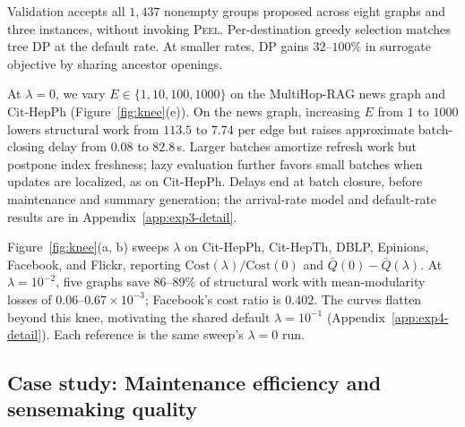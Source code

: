 



 Validation accepts all $1{,}437$ nonempty groups
proposed across eight graphs and three instances, without invoking
\textsc{Peel}. Per-destination greedy selection matches tree DP at the
default rate. At smaller rates, DP gains $32$--$100\%$ in surrogate objective
by sharing ancestor openings.

% 

\label{sec:exp:batch}
At $\lambda=0$, we vary $E\in\{1,10,100,1000\}$ on the MultiHop-RAG
news graph and Cit-HepPh (Figure~\ref{fig:knee}(e)). On the news graph,
increasing $E$ from $1$ to $1000$ lowers structural work from $113.5$ to
$7.74$ per edge but raises approximate batch-closing delay from $0.08$ to
$82.8$\,s. Larger batches amortize refresh work but postpone index freshness;
lazy evaluation further favors small batches when updates are localized,
as on Cit-HepPh. Delays end at batch closure, before maintenance and
summary generation; the arrival-rate model and default-rate results are
in Appendix~\ref{app:exp3-detail}.

Figure~\ref{fig:knee}(a, b) sweeps $\lambda$ on Cit-HepPh, Cit-HepTh, DBLP,
Epinions, Facebook, and Flickr, reporting
$\mathrm{Cost}(\lambda)/\mathrm{Cost}(0)$ and $\bar Q(0)-\bar Q(\lambda)$.
At $\lambda=10^{-2}$, five graphs save $86$--$89\%$ of structural work with
mean-modularity losses of $0.06$--$0.67\times10^{-3}$; Facebook's cost ratio
is $0.402$. The curves flatten beyond this knee, motivating the shared
default $\lambda=10^{-1}$ (Appendix~\ref{app:exp4-detail}). Each reference
is the same sweep's $\lambda=0$ run.

\subsection{Case study: Maintenance efficiency and sensemaking quality}
\label{sec:exp:e2e}

